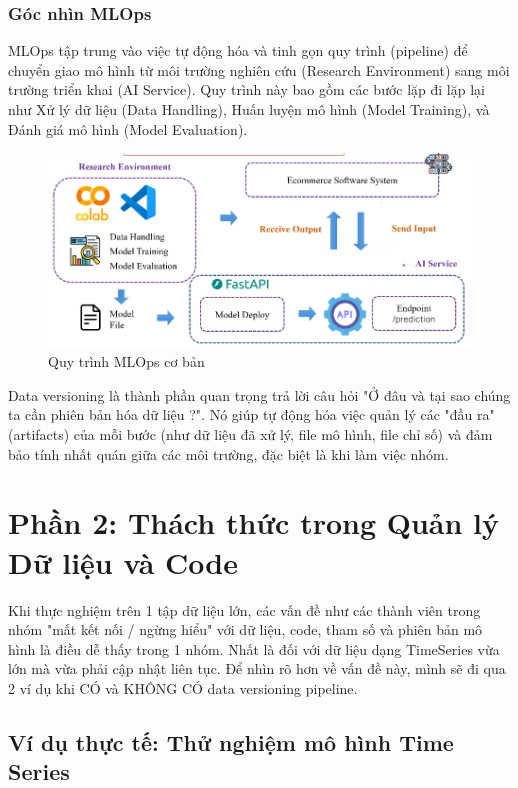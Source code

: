 \documentclass[11pt]{article}
\begin{document}
\subsubsection{Góc nhìn MLOps}
MLOps tập trung vào việc tự động hóa và tinh gọn quy trình (pipeline) để chuyển giao mô hình từ môi trường nghiên cứu (Research Environment) sang môi trường triển khai (AI Service). Quy trình này bao gồm các bước lặp đi lặp lại như Xử lý dữ liệu (Data Handling), Huấn luyện mô hình (Model Training), và Đánh giá mô hình (Model Evaluation).

\begin{figure}[H]
    \centering
    \includegraphics[width=0.9\linewidth]{images/mlop_pipeline.png}
    \caption{Quy trình MLOps cơ bản}
\end{figure}

Data versioning là thành phần quan trọng trả lời câu hỏi "Ở đâu và tại sao chúng ta cần phiên bản hóa dữ liệu ?". Nó giúp tự động hóa việc quản lý các "đầu ra" (artifacts) của mỗi bước (như dữ liệu đã xử lý, file mô hình, file chỉ số) và đảm bảo tính nhất quán giữa các môi trường, đặc biệt là khi làm việc nhóm.


\section{Phần 2: Thách thức trong Quản lý Dữ liệu và Code}
Khi thực nghiệm trên 1 tập dữ liệu lớn, các vấn đề như các thành viên trong nhóm "mất kết nối / ngừng hiểu" với dữ liệu, code, tham số và phiên bản mô hình là điều dễ thấy trong 1 nhóm. Nhất là đối với dữ liệu dạng TimeSeries vừa lớn mà vừa phải cập nhật liên tục. Để nhìn rõ hơn về vấn đề này, mình sẽ đi qua 2 ví dụ khi CÓ và KHÔNG CÓ data versioning pipeline.

\subsection{Ví dụ thực tế: Thử nghiệm mô hình Time Series}
\end{document}
